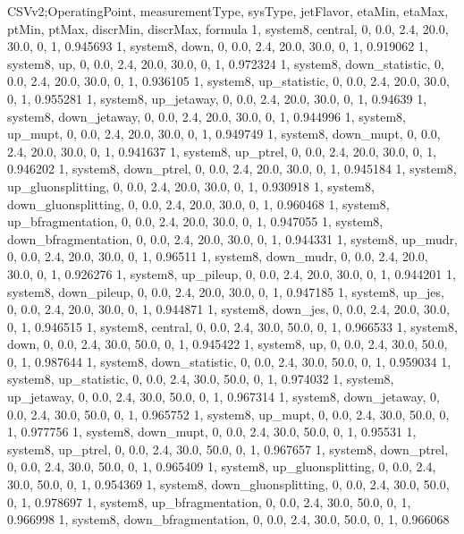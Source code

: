 CSVv2;OperatingPoint, measurementType, sysType, jetFlavor, etaMin, etaMax, ptMin, ptMax, discrMin, discrMax, formula
1, system8, central,    0, 0.0, 2.4, 20.0, 30.0, 0, 1, 0.945693
1, system8, down,       0, 0.0, 2.4, 20.0, 30.0, 0, 1, 0.919062
1, system8, up,         0, 0.0, 2.4, 20.0, 30.0, 0, 1, 0.972324
1, system8, down_statistic,       0, 0.0, 2.4, 20.0, 30.0, 0, 1, 0.936105
1, system8, up_statistic,         0, 0.0, 2.4, 20.0, 30.0, 0, 1, 0.955281
1, system8, up_jetaway,      0, 0.0, 2.4, 20.0, 30.0, 0, 1, 0.94639
1, system8, down_jetaway,    0, 0.0, 2.4, 20.0, 30.0, 0, 1, 0.944996
1, system8, up_mupt,         0, 0.0, 2.4, 20.0, 30.0, 0, 1, 0.949749
1, system8, down_mupt,       0, 0.0, 2.4, 20.0, 30.0, 0, 1, 0.941637
1, system8, up_ptrel,        0, 0.0, 2.4, 20.0, 30.0, 0, 1, 0.946202
1, system8, down_ptrel,      0, 0.0, 2.4, 20.0, 30.0, 0, 1, 0.945184
1, system8, up_gluonsplitting, 0, 0.0, 2.4, 20.0, 30.0, 0, 1, 0.930918
1, system8, down_gluonsplitting, 0, 0.0, 2.4, 20.0, 30.0, 0, 1, 0.960468
1, system8, up_bfragmentation, 0, 0.0, 2.4, 20.0, 30.0, 0, 1, 0.947055
1, system8, down_bfragmentation, 0, 0.0, 2.4, 20.0, 30.0, 0, 1, 0.944331
1, system8, up_mudr,         0, 0.0, 2.4, 20.0, 30.0, 0, 1, 0.96511
1, system8, down_mudr,       0, 0.0, 2.4, 20.0, 30.0, 0, 1, 0.926276
1, system8, up_pileup,       0, 0.0, 2.4, 20.0, 30.0, 0, 1, 0.944201
1, system8, down_pileup,     0, 0.0, 2.4, 20.0, 30.0, 0, 1, 0.947185
1, system8, up_jes,          0, 0.0, 2.4, 20.0, 30.0, 0, 1, 0.944871
1, system8, down_jes,        0, 0.0, 2.4, 20.0, 30.0, 0, 1, 0.946515
1, system8, central,    0, 0.0, 2.4, 30.0, 50.0, 0, 1, 0.966533
1, system8, down,       0, 0.0, 2.4, 30.0, 50.0, 0, 1, 0.945422
1, system8, up,         0, 0.0, 2.4, 30.0, 50.0, 0, 1, 0.987644
1, system8, down_statistic,       0, 0.0, 2.4, 30.0, 50.0, 0, 1, 0.959034
1, system8, up_statistic,         0, 0.0, 2.4, 30.0, 50.0, 0, 1, 0.974032
1, system8, up_jetaway,      0, 0.0, 2.4, 30.0, 50.0, 0, 1, 0.967314
1, system8, down_jetaway,    0, 0.0, 2.4, 30.0, 50.0, 0, 1, 0.965752
1, system8, up_mupt,         0, 0.0, 2.4, 30.0, 50.0, 0, 1, 0.977756
1, system8, down_mupt,       0, 0.0, 2.4, 30.0, 50.0, 0, 1, 0.95531
1, system8, up_ptrel,        0, 0.0, 2.4, 30.0, 50.0, 0, 1, 0.967657
1, system8, down_ptrel,      0, 0.0, 2.4, 30.0, 50.0, 0, 1, 0.965409
1, system8, up_gluonsplitting, 0, 0.0, 2.4, 30.0, 50.0, 0, 1, 0.954369
1, system8, down_gluonsplitting, 0, 0.0, 2.4, 30.0, 50.0, 0, 1, 0.978697
1, system8, up_bfragmentation, 0, 0.0, 2.4, 30.0, 50.0, 0, 1, 0.966998
1, system8, down_bfragmentation, 0, 0.0, 2.4, 30.0, 50.0, 0, 1, 0.966068
